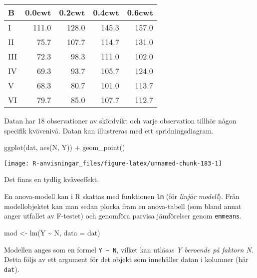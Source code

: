 \documentclass[
]{book}
\newenvironment{Shaded}{\begin{snugshade}}{\end{snugshade}}
\newcommand{\AttributeTok}[1]{\textcolor[rgb]{0.77,0.63,0.00}{#1}}
\newcommand{\FunctionTok}[1]{\textcolor[rgb]{0.00,0.00,0.00}{#1}}
\newcommand{\NormalTok}[1]{#1}
\newcommand{\OtherTok}[1]{\textcolor[rgb]{0.56,0.35,0.01}{#1}}
\newcommand{\SpecialCharTok}[1]{\textcolor[rgb]{0.00,0.00,0.00}{#1}}
\theoremstyle{definition}
\theoremstyle{definition}
\theoremstyle{definition}
\theoremstyle{definition}
\theoremstyle{remark}
\begin{document}
\begin{table}
\centering
\begin{tabular}[t]{lrrrr}
\toprule
B & 0.0cwt & 0.2cwt & 0.4cwt & 0.6cwt\\
\midrule
I & 111.0 & 128.0 & 145.3 & 157.0\\
II & 75.7 & 107.7 & 114.7 & 131.0\\
III & 72.3 & 98.3 & 111.0 & 102.0\\
IV & 69.3 & 93.7 & 105.7 & 124.0\\
V & 68.3 & 80.7 & 101.0 & 113.7\\
\addlinespace
VI & 79.7 & 85.0 & 107.7 & 112.7\\
\bottomrule
\end{tabular}
\end{table}

Datan har 18 observationer av skördvikt och varje observation tillhör någon specifik kvävenivå. Datan kan illustreras med ett spridningsdiagram.

\begin{Shaded}
\begin{Highlighting}[]
\FunctionTok{ggplot}\NormalTok{(dat, }\FunctionTok{aes}\NormalTok{(N, Y)) }\SpecialCharTok{+}
  \FunctionTok{geom\_point}\NormalTok{()}
\end{Highlighting}
\end{Shaded}

\begin{center}\texttt{[image: R-anvisningar\_files/figure-latex/unnamed-chunk-183-1]} \end{center}

Det finns en tydlig kväveeffekt.

En anova-modell kan i R skattas med funktionen \texttt{lm} (för \emph{linjär modell}). Från modellobjektet kan man sedan plocka fram en anova-tabell (som bland annat anger utfallet av F-testet) och genomföra parvisa jämförelser genom \texttt{emmeans}.

\begin{Shaded}
\begin{Highlighting}[]
\NormalTok{mod }\OtherTok{\textless{}{-}} \FunctionTok{lm}\NormalTok{(Y }\SpecialCharTok{\textasciitilde{}}\NormalTok{ N, }\AttributeTok{data =}\NormalTok{ dat)}
\end{Highlighting}
\end{Shaded}

Modellen anges som en formel \texttt{Y\ \textasciitilde{}\ N}, vilket kan utläsas \emph{Y beroende på faktorn N}. Detta följs av ett argument för det objekt som innehåller datan i kolumner (här \texttt{dat}).
\end{document}
